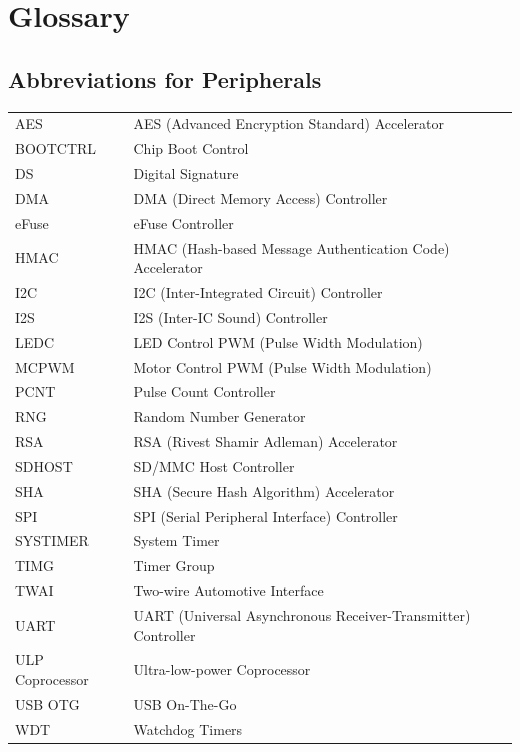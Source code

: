 \section*{Glossary}\label{glossary}
{}
\rhead{\Navigation}

\subsection*{Abbreviations for Peripherals}

\begin{longtable}[c]{ R{3cm} p{12cm} }

AES     & AES (Advanced Encryption Standard) Accelerator \\
BOOTCTRL & Chip Boot Control \\ 
DS      & Digital Signature\\ 
DMA     & DMA (Direct Memory Access) Controller \\
eFuse   & eFuse Controller \\
HMAC    & HMAC (Hash-based Message Authentication Code) Accelerator \\ 
I2C     & I2C (Inter-Integrated Circuit) Controller \\ 
I2S     & I2S (Inter-IC Sound) Controller \\ 
LEDC    & LED Control PWM (Pulse Width Modulation)\\ 
MCPWM   & Motor Control PWM (Pulse Width Modulation) \\
PCNT & Pulse Count Controller \\
RNG     & Random Number Generator \\
RSA     & RSA (Rivest Shamir Adleman) Accelerator \\
SDHOST  & SD/MMC Host Controller \\ 
SHA     & SHA (Secure Hash Algorithm) Accelerator \\
SPI     & SPI (Serial Peripheral Interface) Controller \\
SYSTIMER & System Timer \\ 
TIMG    & Timer Group \\
TWAI    & Two-wire Automotive Interface \\ 
UART    & UART (Universal Asynchronous Receiver-Transmitter) Controller \\
ULP Coprocessor & Ultra-low-power Coprocessor \\ 
USB OTG & USB On-The-Go \\ 
WDT & Watchdog Timers \\

\end{longtable}





